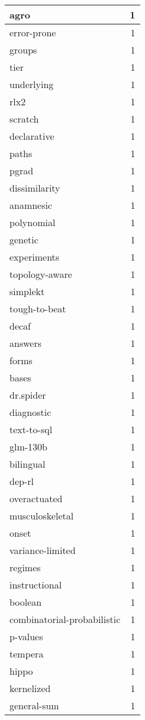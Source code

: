 \begin{table}[h]
\begin{tabular}{|l|r|}
\hline
agro & 1 \\
\hline
error-prone & 1 \\
\hline
groups & 1 \\
\hline
tier & 1 \\
\hline
underlying & 1 \\
\hline
rlx2 & 1 \\
\hline
scratch & 1 \\
\hline
declarative & 1 \\
\hline
paths & 1 \\
\hline
pgrad & 1 \\
\hline
dissimilarity & 1 \\
\hline
anamnesic & 1 \\
\hline
polynomial & 1 \\
\hline
genetic & 1 \\
\hline
experiments & 1 \\
\hline
topology-aware & 1 \\
\hline
simplekt & 1 \\
\hline
tough-to-beat & 1 \\
\hline
decaf & 1 \\
\hline
answers & 1 \\
\hline
forms & 1 \\
\hline
bases & 1 \\
\hline
dr.spider & 1 \\
\hline
diagnostic & 1 \\
\hline
text-to-sql & 1 \\
\hline
glm-130b & 1 \\
\hline
bilingual & 1 \\
\hline
dep-rl & 1 \\
\hline
overactuated & 1 \\
\hline
musculoskeletal & 1 \\
\hline
onset & 1 \\
\hline
variance-limited & 1 \\
\hline
regimes & 1 \\
\hline
instructional & 1 \\
\hline
boolean & 1 \\
\hline
combinatorial-probabilistic & 1 \\
\hline
p-values & 1 \\
\hline
tempera & 1 \\
\hline
hippo & 1 \\
\hline
kernelized & 1 \\
\hline
general-sum & 1 \\

\end{tabular}
\end{table}
